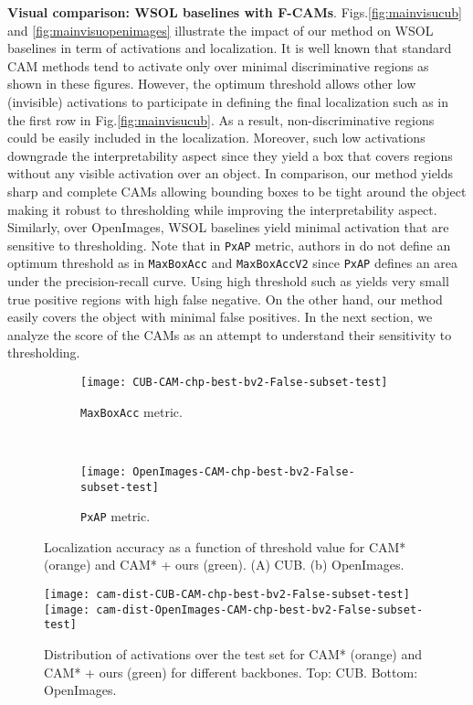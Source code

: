 \documentclass[twocolumn]{article}
\newcommand\maxboxacc{\texttt{MaxBoxAcc}\xspace}
\newcommand\newmaxboxacc{\texttt{MaxBoxAccV2}\xspace}
\newcommand\pxap{\texttt{PxAP}\xspace}
\theoremstyle{definition}
\begin{document}
\noindent \textbf{Visual comparison: WSOL baselines with F-CAMs}. Figs.\ref{fig:mainvisucub} and \ref{fig:mainvisuopenimages} illustrate the impact of our method on WSOL baselines in term of activations and localization. It is well known that standard CAM methods tend to activate only over minimal discriminative regions as shown in these figures. However, the optimum threshold allows other low (invisible) activations to participate in defining the final localization such as in the first row in Fig.\ref{fig:mainvisucub}.  As a result, non-discriminative regions could be easily included in the localization. Moreover, such low activations downgrade the interpretability aspect since they yield a box that covers regions without any visible activation over an object.
In comparison, our method yields sharp and complete CAMs allowing bounding boxes to be tight around the object making it robust to thresholding while improving the interpretability aspect.
Similarly, over OpenImages, WSOL baselines yield minimal activation that are sensitive to thresholding. Note that in \pxap metric, authors in \cite{choe2020evaluating} do not define an optimum threshold as in \maxboxacc and \newmaxboxacc since \pxap defines an area under the precision-recall curve. Using high threshold such as  yields very small true positive regions with high false negative. On the other hand, our method easily covers the object with minimal false positives.
In the next section, we analyze the score of the CAMs as an attempt to understand their sensitivity to thresholding.
\begin{figure}
     \centering
     \begin{subfigure}[b]{0.45\textwidth}
         \centering
         \texttt{[image: CUB-CAM-chp-best-bv2-False-subset-test]}
          \caption{\maxboxacc metric.}
         \label{fig:cam-maxbo-tau}
     \end{subfigure}
     \\
     \vspace{.2cm}
     \begin{subfigure}[b]{0.45\textwidth}
         \centering
         \texttt{[image: OpenImages-CAM-chp-best-bv2-False-subset-test]}
          \caption{\pxap metric.}
         \label{fig:cam-pxap-tau}
     \end{subfigure}
        \caption{Localization accuracy as a function of threshold value  for CAM* (orange) and  CAM* + ours (green). (A) CUB. (b) OpenImages.}
        \label{fig:cam-tau}
\end{figure}
\begin{figure}
     \centering
         \texttt{[image: cam-dist-CUB-CAM-chp-best-bv2-False-subset-test]}
            \\
         \texttt{[image: cam-dist-OpenImages-CAM-chp-best-bv2-False-subset-test]}
        \caption{Distribution of activations over the test set for CAM* (orange) and CAM* + ours (green) for different backbones. Top: CUB. Bottom: OpenImages.}
        \label{fig:cam-ac-distribution}
\end{figure}
\end{document}
